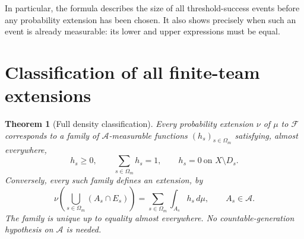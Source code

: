 \documentclass[11pt,letterpaper]{article}
\newtheorem{theorem}{Theorem}[section]
\theoremstyle{definition}
\newcommand{\Fext}{\mathcal F}
\newcommand{\A}{\mathcal A}
\begin{document}
In particular, the formula describes the size of all threshold-success events before any probability extension has been chosen. It also shows precisely when such an event is already measurable: its lower and upper expressions must be equal.

\section{Classification of all finite-team extensions}
\label{mbg:ext:sec:classification}

\begin{theorem}[Full density classification]
\label{mbg:ext:thm:density}
Every probability extension $\nu$ of $\mu$ to $\Fext$ corresponds to a family of $\A$-measurable functions $(h_s)_{s\in\Omega_m}$ satisfying, almost everywhere,
\begin{equation}
h_s\ge0,\qquad \sum_{s\in\Omega_m}h_s=1,\qquad
h_s=0\ \text{on }X\setminus D_s.
\label{mbg:ext:eq:densityconditions}
\end{equation}
Conversely, every such family defines an extension, by
\begin{equation}
\boxed{\qquad
\nu\left(\bigcup_{s\in\Omega_m}(A_s\cap E_s)\right)
=\sum_{s\in\Omega_m}\int_{A_s}h_s\,d\mu,
\qquad A_s\in\A.
\qquad}
\label{mbg:ext:eq:extension}
\end{equation}
The family is unique up to equality almost everywhere. No countable-generation hypothesis on $\A$ is needed.
\end{theorem}
\end{document}
